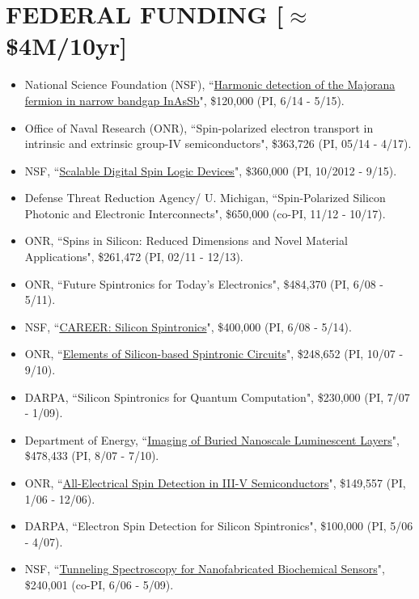 \documentclass[paper=letter,fontsize=11pt]{scrartcl} %
\newcommand{\NewPart}[2]{\section*{\uppercase{#1} #2}}
\newcommand{\FundingEntry}[5]{
        \noindent #1, ``#2", \$#3 (#4, #5).}
\begin{document}


\NewPart{Federal Funding}{[$\approx$\$4M/10yr]}

\begin{itemize}

\item\FundingEntry {National Science Foundation (NSF)}{\href{http://www.nsf.gov/awardsearch/showAward?AWD_ID=1408796}{Harmonic detection of the Majorana fermion in narrow bandgap InAsSb}}{120,000}{PI}{6/14 - 5/15}
\item\FundingEntry {Office of Naval Research (ONR)}{Spin-polarized electron transport in intrinsic and extrinsic group-IV semiconductors}{363,726}{PI}{05/14 - 4/17}
\item\FundingEntry {NSF}{\href{http://www.nsf.gov/awardsearch/showAward?AWD_ID=1231855}{Scalable Digital Spin Logic Devices}}{360,000}{PI}{10/2012 - 9/15}
\item\FundingEntry {Defense Threat Reduction Agency/ U. Michigan}{Spin-Polarized Silicon Photonic and Electronic Interconnects}{650,000}{co-PI}{11/12 - 10/17}
\item\FundingEntry {ONR}{Spins in Silicon: Reduced Dimensions and Novel Material Applications}{261,472}{PI}{02/11 - 12/13}
\item\FundingEntry {ONR}{Future Spintronics for Today's Electronics}{484,370}{PI}{6/08 - 5/11}
\item\FundingEntry {NSF}{\href{http://www.nsf.gov/awardsearch/showAward?AWD_ID=0901941}{CAREER: Silicon Spintronics}}{400,000}{PI}{6/08 - 5/14}
\item\FundingEntry {ONR}{\href{http://www.dtic.mil/dtic/tr/fulltext/u2/a533911.pdf}{Elements of Silicon-based Spintronic Circuits}}{248,652}{PI}{10/07 - 9/10}
\item\FundingEntry {DARPA}{Silicon Spintronics for Quantum Computation}{230,000}{PI}{7/07 - 1/09} 
\item\FundingEntry {Department of Energy}{\href{http://www.osti.gov/scitech/biblio/1067346}{Imaging of Buried Nanoscale Luminescent Layers}}{478,433 }{PI}{8/07 - 7/10}
\item\FundingEntry {ONR}{\href{http://www.dtic.mil/dtic/tr/fulltext/u2/a462737.pdf}{All-Electrical Spin Detection in III-V Semiconductors}}{149,557}{PI}{1/06  - 12/06}
\item\FundingEntry {DARPA}{Electron Spin Detection for Silicon Spintronics}{100,000}{PI}{5/06 - 4/07}
\item\FundingEntry {NSF}{\href{http://www.nsf.gov/awardsearch/showAward?AWD_ID=0601269}{Tunneling Spectroscopy for Nanofabricated Biochemical Sensors}}{240,001}{co-PI}{6/06 - 5/09}

\end{itemize}
\end{document}
